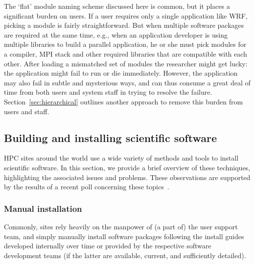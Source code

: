 The `flat' module naming scheme discussed here is common, but it places a significant
burden on users. If a user requires only a single application like WRF, picking a
module is fairly straightforward. But when multiple software packages are required
at the same time, e.g., when an application developer is using multiple libraries to
build a parallel application, he or she must pick modules for a
compiler, MPI stack and other required libraries that are compatible with each other.
After loading a mismatched set of modules the researcher might get lucky: the application might fail to run or die immediately.  However, the
application may also fail in subtle and mysterious ways, and can thus consume a
great deal of time from both users and system staff in trying to resolve the failure.
Section~\ref{sec:hierarchical} outlines another approach to remove this burden
from users and staff.


%
%


\subsection{Building and installing scientific software}
\label{sec:installing}

HPC sites around the world use a wide variety of methods and tools to
install scientific software. In this section, we provide a brief
overview of these techniques,
highlighting the associated issues and problems. These observations are
supported by the results of a recent poll concerning these
topics~\cite{ISC14bof}.

\subsubsection{Manual installation}

Commonly, sites rely heavily on the manpower of (a part of)
the user support team, and simply manually install software packages following
the install guides developed internally over time or provided
by the respective software development teams (if the latter are available, current, and
sufficiently detailed).


